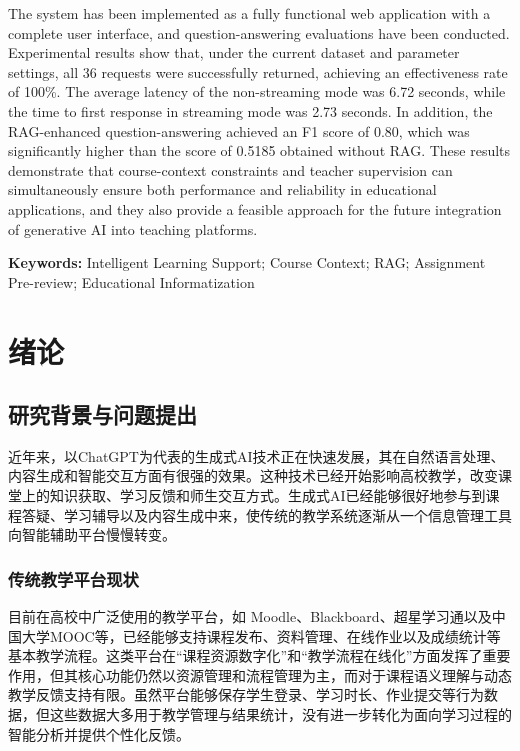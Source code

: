 \documentclass[12pt,a4paper,oneside]{ctexbook}
\numberwithin{equation}{chapter}
\begin{document}
The system has been implemented as a fully functional web application with a complete user interface, and question-answering evaluations have been conducted. Experimental results show that, under the current dataset and parameter settings, all 36 requests were successfully returned, achieving an effectiveness rate of 100\%. The average latency of the non-streaming mode was 6.72 seconds, while the time to first response in streaming mode was 2.73 seconds. In addition, the RAG-enhanced question-answering achieved an F1 score of 0.80, which was significantly higher than the score of 0.5185 obtained without RAG. These results demonstrate that course-context constraints and teacher supervision can simultaneously ensure both performance and reliability in educational applications, and they also provide a feasible approach for the future integration of generative AI into teaching platforms.


\vspace{1em}
\noindent\textbf{Keywords:} Intelligent Learning Support; Course Context; RAG; Assignment Pre-review; Educational Informatization

\cleardoublepage
\pagestyle{tocmatterstyle}
\tableofcontents
\cleardoublepage
{}
\pagestyle{mainmatterstyle}

\chapter{绪论}

\section{研究背景与问题提出}
近年来，以ChatGPT为代表的生成式AI技术正在快速发展，其在自然语言处理、内容生成和智能交互方面有很强的效果。这种技术已经开始影响高校教学，改变课堂上的知识获取、学习反馈和师生交互方式\cite{ref9,ref10}。生成式AI已经能够很好地参与到课程答疑、学习辅导以及内容生成中来，使传统的教学系统逐渐从一个信息管理工具向智能辅助平台慢慢转变。

\subsection{传统教学平台现状}
目前在高校中广泛使用的教学平台，如 Moodle、Blackboard、超星学习通以及中国大学MOOC等，已经能够支持课程发布、资料管理、在线作业以及成绩统计等基本教学流程。这类平台在“课程资源数字化”和“教学流程在线化”方面发挥了重要作用，但其核心功能仍然以资源管理和流程管理为主，而对于课程语义理解与动态教学反馈支持有限。虽然平台能够保存学生登录、学习时长、作业提交等行为数据，但这些数据大多用于教学管理与结果统计，没有进一步转化为面向学习过程的智能分析并提供个性化反馈。
\end{document}
